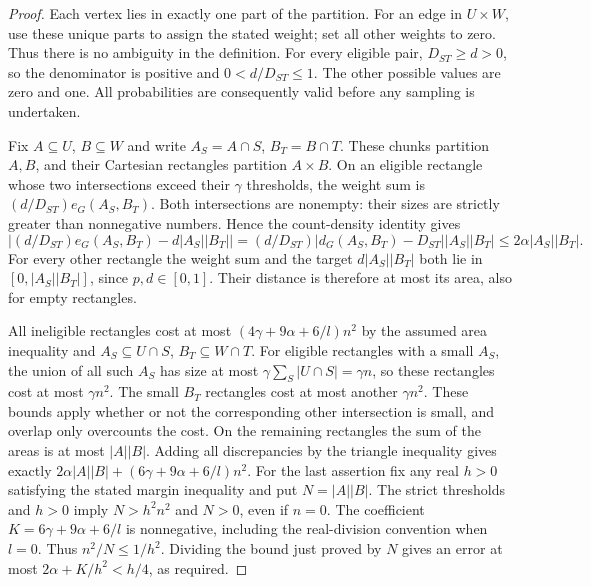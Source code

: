 \begin{proof}
Each vertex lies in exactly one part of the partition. For an edge
in $U\times W$, use these unique parts to assign the stated weight;
set all other weights to zero. Thus there is no ambiguity in the
definition. For every eligible pair, $D_{ST}\geq d>0$, so the
denominator is positive and $0<d/D_{ST}\leq1$. The other possible
values are zero and one. All probabilities are consequently valid
before any sampling is undertaken.

Fix $A\subseteq U$, $B\subseteq W$ and write $A_S=A\cap S$,
$B_T=B\cap T$. These chunks partition $A,B$, and their Cartesian
rectangles partition $A\times B$. On an eligible rectangle whose
two intersections exceed their $\gamma$ thresholds, the weight sum
is $(d/D_{ST})e_G(A_S,B_T)$. Both intersections are nonempty:
their sizes are strictly greater than nonnegative numbers. Hence
the count-density identity gives
\[
 \left|(d/D_{ST})e_G(A_S,B_T)-d|A_S||B_T|\right|
 = (d/D_{ST})|d_G(A_S,B_T)-D_{ST}||A_S||B_T|
 \leq2\alpha|A_S||B_T|.
\]
For every other rectangle the weight sum and the target
$d|A_S||B_T|$ both lie in $[0,|A_S||B_T|]$, since $p,d\in[0,1]$.
Their distance is therefore at most its area, also for empty
rectangles.

All ineligible rectangles cost at most
$(4\gamma+9\alpha+6/l)n^2$ by the assumed area inequality and
$A_S\subseteq U\cap S$, $B_T\subseteq W\cap T$.
For eligible rectangles with a small $A_S$, the union of all such
$A_S$ has size at most
$\gamma\sum_S|U\cap S|=\gamma n$, so these rectangles cost at most
$\gamma n^2$. The small $B_T$ rectangles cost at most another
$\gamma n^2$. These bounds apply whether or not the corresponding
other intersection is small, and overlap only overcounts the cost.
On the remaining rectangles the sum of the areas is at most
$|A||B|$. Adding all discrepancies by the triangle inequality
gives exactly
$2\alpha|A||B|+(6\gamma+9\alpha+6/l)n^2$.
For the last assertion fix any real $h>0$ satisfying the stated margin
inequality and put $N=|A||B|$. The strict thresholds and
$h>0$ imply $N>h^2n^2$ and $N>0$, even if $n=0$.
The coefficient $K=6\gamma+9\alpha+6/l$ is nonnegative, including
the real-division convention when $l=0$. Thus $n^2/N\leq1/h^2$.
Dividing the bound just proved by $N$ gives an error at most
$2\alpha+K/h^2<h/4$, as required.
\end{proof}
